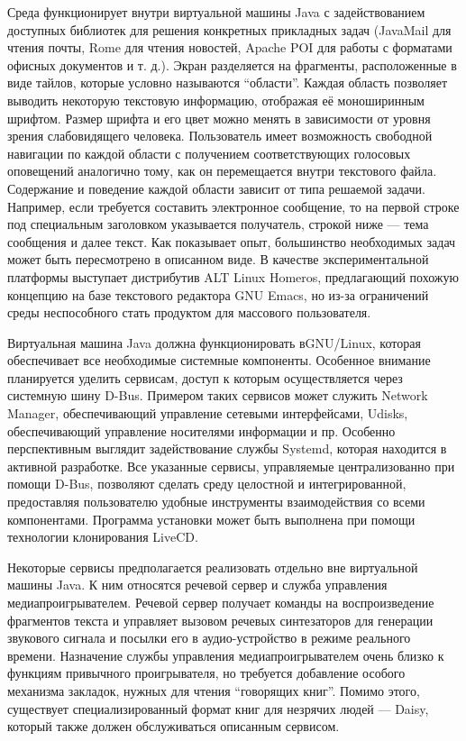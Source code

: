 \documentclass[10pt, a5paper]{article}
\begin{document}
Среда функционирует внутри виртуальной машины Java с задействованием доступных библиотек для решения конкретных прикладных задач (JavaMail для чтения почты, Rome для чтения новостей, Apache POI для работы с форматами офисных документов и т. д.). Экран разделяется на фрагменты, расположенные в виде тайлов, которые условно называются ``области''. Каждая область позволяет выводить некоторую текстовую информацию, отображая её моноширинным шрифтом. Размер шрифта и его цвет можно менять в зависимости от уровня зрения слабовидящего человека. Пользователь имеет возможность свободной навигации по каждой области с получением соответствующих голосовых оповещений аналогично тому, как он перемещается внутри текстового файла. Содержание и поведение каждой области зависит от типа решаемой задачи. Например, если требуется составить электронное сообщение, то на первой строке под специальным заголовком указывается получатель, строкой ниже — тема сообщения и далее текст. Как показывает опыт, большинство необходимых задач может быть пересмотрено в описанном виде. В качестве экспериментальной платформы выступает дистрибутив ALT Linux Homeros, предлагающий похожую концепцию на базе текстового редактора GNU Emacs, но из-за ограничений среды неспособного стать продуктом для массового пользователя.

Виртуальная машина Java должна функционировать в\linebreak GNU/Linux, которая обеспечивает все необходимые системные компоненты. Особенное внимание планируется уделить сервисам, доступ к которым осуществляется через системную шину D-Bus. Примером таких сервисов может служить Network Manager, обеспечивающий управление сетевыми интерфейсами, Udisks, обеспечивающий управление носителями информации и пр. Особенно перспективным выглядит задействование службы Systemd, которая находится в активной разработке. Все указанные сервисы, управляемые централизованно при помощи D-Bus, позволяют сделать среду целостной и интегрированной, предоставляя пользователю удобные инструменты взаимодействия со всеми компонентами. Программа установки может быть выполнена при помощи технологии клонирования LiveCD.

Некоторые сервисы предполагается реализовать отдельно вне виртуальной машины Java. К ним относятся речевой сервер и служба управления медиапроигрывателем. Речевой сервер получает команды на воспроизведение фрагментов текста и управляет вызовом речевых синтезаторов для  генерации звукового сигнала и посылки его в аудио-устройство в режиме реального времени. Назначение службы управления медиапроигрывателем очень близко к функциям привычного проигрывателя, но требуется добавление особого механизма закладок, нужных для чтения ``говорящих книг''. Помимо этого, существует специализированный формат книг для незрячих людей — Daisy, который также должен обслуживаться описанным сервисом.
\end{document}
